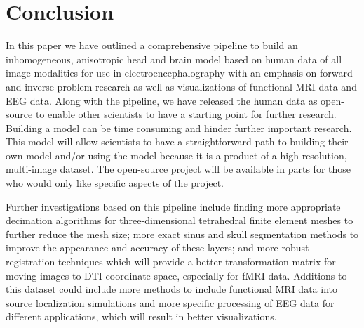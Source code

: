 %
%

\section{Conclusion}
\label{sec:Conclusion}

In this paper we have outlined a comprehensive pipeline to build an inhomogeneous, anisotropic head and brain model based on human data of all image modalities for use in electroencephalography with an emphasis on forward and inverse problem research as well as visualizations of functional MRI data and EEG data. Along with the pipeline, we have released the human data as open-source to enable other scientists to have a starting point for further research. Building a model can be time consuming and hinder further important research. This model will allow scientists to have a straightforward path to building their own model and/or using the model because it is a product of a high-resolution, multi-image dataset. The open-source project will be available in parts for those who would only like specific aspects of the project. 

Further investigations based on this pipeline include finding more appropriate decimation algorithms for three-dimensional tetrahedral finite element meshes to further reduce the mesh size; more exact sinus and skull segmentation methods to improve the appearance and accuracy of these layers; and more robust registration techniques which will provide a better transformation matrix for moving images to DTI coordinate space, especially for fMRI data. Additions to this dataset could include more methods to include functional MRI data into source localization simulations and more specific processing of EEG data for different applications, which will result in better visualizations. 